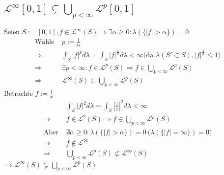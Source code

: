 \documentclass[12pt,a4paper]{article}
\begin{document}
\subsection*{$\mathscr{L}^{\infty}[0,1] \subsetneq \bigcup_{p < \infty}\mathscr{L}^{p}[0,1]$}
Seien $S:= [0,1], f \in \mathscr{L}^\infty(S)\Rightarrow \exists \alpha \geq 0: \lambda(\{|f| > \alpha \})=0$
\begin{align*}
	\text{Wähle } & p := \frac{1}{\alpha}\\
	\Rightarrow&\int_S |f|^p d\lambda = \int_S \left\lvert f \right\lvert^{\frac{1}{\alpha}}d\lambda < \infty	\big( \text{da }\lambda(S' \subset S), \left\lvert f \right\lvert^{\frac{1}{\alpha}} \leq 1 \big)\\
	\Rightarrow &\exists p < \infty : f \in \mathscr{L}^p(S) \Rightarrow f \in \bigcup_{p < \infty} \mathscr{L}^p(S)\\
	\Rightarrow &\mathscr{L}^\infty(S) \subset \bigcup_{p < \infty} \mathscr{L}^p(S)
\end{align*}
Betrachte $f := \frac{1}{x}$
\begin{align*}
&\int_S	\left\lvert f\right\lvert^2 d\lambda = \int_S	\left\lvert \frac{1}{x}\right\lvert^2 d\lambda < \infty\\
\Rightarrow &f \in \mathscr{L}^2(S) \Rightarrow f \in \bigcup_{p<\infty} \mathscr{L}^p(S)\\
\text{Aber } & \nexists \alpha \geq 0: \lambda(\{|f|>\alpha\}) = 0 \ \big(\lambda(\{|f|=\infty\} )=0\big)\\
\Rightarrow& f \notin \mathscr{L}^\infty\\
\Rightarrow& \bigcup_{p<\infty}\mathscr{L}^p(S)
\not\subset \mathscr{L}^\infty(S)
\end{align*}
$\Rightarrow \mathscr{L}^{\infty}(S) \subsetneq \bigcup_{p < \infty}\mathscr{L}^{p}(S)$
\end{document}
